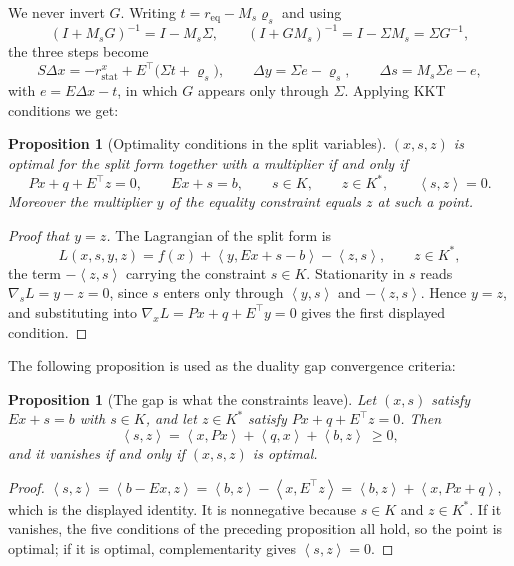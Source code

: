 \documentclass[a4paper,11pt]{book}
\theoremstyle{plain}
\newtheorem{proposition}[theorem]{Proposition}
\theoremstyle{definition}
\theoremstyle{remark}
\numberwithin{equation}{chapter}
\numberwithin{algorithm}{chapter}
\newcommand{\inner}[2]{\left\langle #1, #2 \right\rangle}
\begin{document}
	We never invert $G$. Writing $t=r_{\mathrm{eq}}-M_s\varrho_s$ and using
	\begin{equation}
		(I+M_sG)^{-1}=I-M_s\Sigma,
		\qquad
		(I+GM_s)^{-1}=I-\Sigma M_s=\Sigma G^{-1},
	\end{equation}
	the three steps become
	\begin{equation}
		S\Delta x=-r^{x}_{\mathrm{stat}}+E^{\top}\bigl(\Sigma t+\varrho_s\bigr),
		\qquad
		\Delta y=\Sigma e-\varrho_s,
		\qquad
		\Delta s=M_s\Sigma e-e ,
	\end{equation}
	with $e=E\Delta x-t$, in which $G$ appears only through $\Sigma$.
	Applying KKT conditions we get:
	\begin{proposition}[Optimality conditions in the split variables]
		$(x,s,z)$ is optimal for the split form together with a multiplier if and only
		if
		\begin{equation}
			Px+q+E^\top z=0,\qquad Ex+s=b,\qquad s\in K,\qquad z\in K^*,\qquad
			\inner{s}{z}=0 .
		\end{equation}
		Moreover the multiplier $y$ of the equality constraint equals $z$ at such a
		point.
	\end{proposition}
	
	\begin{proof}[Proof that $y=z$]
		The Lagrangian of the split form is
		\begin{equation}
			L(x,s,y,z)=f(x)+\inner{y}{Ex+s-b}-\inner{z}{s},
			\qquad z\in K^* ,
		\end{equation}
		the term $-\inner{z}{s}$ carrying the constraint $s\in K$. Stationarity in $s$
		reads $\nabla_sL=y-z=0$, since $s$ enters only through $\inner{y}{s}$ and
		$-\inner{z}{s}$. Hence $y=z$, and substituting into $\nabla_xL=Px+q+E^\top y=0$
		gives the first displayed condition.
	\end{proof}
	
	The following proposition is used as the duality gap  convergence criteria:
	
	\begin{proposition}[The gap is what the constraints leave]\label{prop:gap}
		Let $(x,s)$ satisfy $Ex+s=b$ with $s\in K$, and let $z\in K^*$ satisfy
		$Px+q+E^\top z=0$. Then
		\begin{equation}
			\inner{s}{z}=\inner{x}{Px}+\inner{q}{x}+\inner{b}{z}\ \geq0 ,
		\end{equation}
		and it vanishes if and only if $(x,s,z)$ is optimal.
	\end{proposition}
	
	\begin{proof}
		$\inner{s}{z}=\inner{b-Ex}{z}=\inner{b}{z}-\inner{x}{E^\top z}
		=\inner{b}{z}+\inner{x}{Px+q}$, which is the displayed identity. It is
		nonnegative because $s\in K$ and $z\in K^*$. If it vanishes, the five
		conditions of the preceding proposition all hold, so the point is optimal; if
		it is optimal, complementarity gives $\inner{s}{z}=0$.
	\end{proof}
	
\end{document}
